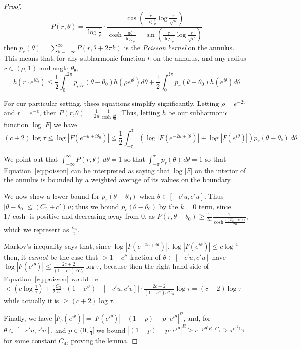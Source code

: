 \documentclass[11pt]{article}
\theoremstyle{plain}
\begin{document}
\begin{proof}
    \begin{equation*}
        P(r,\theta) = \frac{1}{\log\frac{1}{\rho}} \cdot \frac{\cos \left( \frac{\pi}{\log\frac{1}{\rho}} \log \frac{r}{\sqrt{\rho}}\right)}{\cosh \frac{\pi \theta}{\log\frac{1}{\rho}} - \sin \left(\frac{\pi}{\log\frac{1}{\rho}} \log \frac{r}{\sqrt{\rho}}\right)}
    \end{equation*}
    then $p_r(\theta) = \sum_{k=-\infty}^{\infty} P(r,\theta+2\pi k)$ is the \emph{Poisson kernel} on the annulus. This means that, for any subharmonic function $h$ on the annulus, and any radius $r\in (\rho,1)$ and angle $\theta_0$, 
    \begin{equation*}
        h(r\cdot e^{i\theta_0}) \leq \frac{1}{2}\int_0^{2\pi} p_{\rho/r}(\theta-\theta_0) h(\rho e^{i\theta}) d\theta +  \frac{1}{2}\int_0^{2\pi} p_{r}(\theta-\theta_0) h(e^{i\theta}) d\theta
    \end{equation*}

For our particular setting, these equations simplify significantly. Letting $\rho=e^{-2u}$ and $r=e^{-u}$, then $P(r,\theta)=\frac{1}{2u}\frac{1}{\cosh\frac{\pi\theta}{2u}}$. Thus, letting $h$ be our subharmonic function $\log|F|$ we have 
\begin{equation}\label{eq:poisson}
(c+2)\log\tau\leq\log|F(e^{-u+i\theta_0 })|\leq\frac{1}{2}\int_{-\pi}^{\pi} \left(\log|F(e^{-2u+i\theta})|+\log|F( e^{i\theta})|\right)p_r(\theta-\theta_0)\,d\theta
\end{equation}

We point out that $\int_{-\infty}^\infty P(r,\theta)\,d\theta=1$ so that $\int_{-\pi}^\pi p_r(\theta)\,d\theta=1$ so that Equation~\ref{eq:poisson} can be interpreted as saying that $\log|F|$ on the interior of the annulus is bounded by a weighted average of its values on the boundary.

We now show a lower bound for $p_r(\theta-\theta_0)$ when $\theta\in [-c'u,c'u]$. Thus $|\theta-\theta_0|\leq (C_2+c')u$; thus we bound $p_r(\theta-\theta_0)$ by the $k=0$ term, since $1/\cosh$ is positive and decreasing away from 0, as $P(r,\theta-\theta_0)\geq \frac{1}{2u}\frac{1}{\cosh \frac{\pi (C_2+c')u}{2u}}$, which we represent as $\frac{C_3}{u}$.

Markov's inequality says that, since $\log|F(e^{-2u+i\theta})|,\log|F( e^{i\theta})|\leq c\log\frac{1}{\tau}$ then, it \emph{cannot} be the case that $> 1-c''$ fraction of $\theta\in [-c'u,c'u]$ have $\log|F( e^{i\theta})|\leq \frac{2c+2}{(1-c'') c' C_3} \log\tau$, because then the right hand side of Equation~\ref{eq:poisson} would be $<(c\log\frac{1}{\tau})+\frac{1}{2}\frac{C_3}{u}\cdot (1-c'')\cdot |[-c'u,c'u]|\cdot\frac{2c+2}{(1-c'') c' C_3} \log\tau=(c+2)\log\tau$ while actually it is $\geq (c+2)\log\tau$.

Finally, we have  $|F_b(e^{i\theta})|=|F(e^{i\theta})|\cdot |(1-p)+p\cdot e^{i\theta}|^R$, and, for $\theta\in [-c'u,c'u]$, and $p\in (0, \frac{1}{4}]$ we bound $|(1-p)+p\cdot e^{i\theta}|^R\geq e^{-p\theta^2R\cdot C_4}\geq \tau^{{c'}^2C_4}$ for some constant $C_4$,
proving the lemma.
\end{proof}
\end{document}
